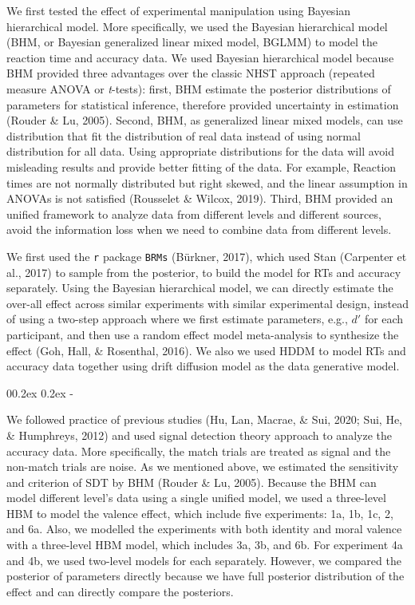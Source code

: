 \documentclass[
  english,
  man]{apa6}
\makeatletter
\let\oldsubparagraph\subparagraph
\renewcommand{\subparagraph}[1]{\oldsubparagraph{#1}\mbox{}}
\renewcommand{\subparagraph}[1]{\@startsection{subparagraph}{5}{1em}%
  {0\baselineskip \@plus 0.2ex \@minus 0.2ex}%
  {-\z@\relax}%
  {\normalfont\normalsize\itshape\hspace{\parindent}{#1}\textit{\addperi}}{\relax}}
\makeatother
\begin{document}
We first tested the effect of experimental manipulation using Bayesian hierarchical model. More specifically, we used the Bayesian hierarchical model (BHM, or Bayesian generalized linear mixed model, BGLMM) to model the reaction time and accuracy data. We used Bayesian hierarchical model because BHM provided three advantages over the classic NHST approach (repeated measure ANOVA or \emph{t}-tests): first, BHM estimate the posterior distributions of parameters for statistical inference, therefore provided uncertainty in estimation (Rouder \& Lu, 2005). Second, BHM, as generalized linear mixed models, can use distribution that fit the distribution of real data instead of using normal distribution for all data. Using appropriate distributions for the data will avoid misleading results and provide better fitting of the data. For example, Reaction times are not normally distributed but right skewed, and the linear assumption in ANOVAs is not satisfied (Rousselet \& Wilcox, 2019). Third, BHM provided an unified framework to analyze data from different levels and different sources, avoid the information loss when we need to combine data from different levels.

We first used the \texttt{r} package \texttt{BRMs} (Bürkner, 2017), which used Stan (Carpenter et al., 2017) to sample from the posterior, to build the model for RTs and accuracy separately. Using the Bayesian hierarchical model, we can directly estimate the over-all effect across similar experiments with similar experimental design, instead of using a two-step approach where we first estimate parameters, e.g., \(d'\) for each participant, and then use a random effect model meta-analysis to synthesize the effect (Goh, Hall, \& Rosenthal, 2016). We also we used HDDM to model RTs and accuracy data together using drift diffusion model as the data generative model.

\hypertarget{accuracy}{%
\subparagraph{Accuracy}\label{accuracy}}

We followed practice of previous studies (Hu, Lan, Macrae, \& Sui, 2020; Sui, He, \& Humphreys, 2012) and used signal detection theory approach to analyze the accuracy data. More specifically, the match trials are treated as signal and the non-match trials are noise. As we mentioned above, we estimated the sensitivity and criterion of SDT by BHM (Rouder \& Lu, 2005). Because the BHM can model different level's data using a single unified model, we used a three-level HBM to model the valence effect, which include five experiments: 1a, 1b, 1c, 2, and 6a. Also, we modelled the experiments with both identity and moral valence with a three-level HBM model, which includes 3a, 3b, and 6b. For experiment 4a and 4b, we used two-level models for each separately. However, we compared the posterior of parameters directly because we have full posterior distribution of the effect and can directly compare the posteriors.
\end{document}
